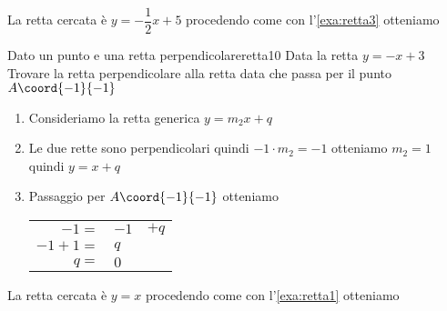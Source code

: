 La retta cercata è $y=-\dfrac{1}{2}x+5$ procedendo come con l'\cref{exa:retta3}
otteniamo
\begin{center}
	
	\label{fig:disegnoretta9}
\end{center}
\begin{esempiot}{Dato un punto e una retta perpendicolare}{retta10}
	Data la retta $y=-x+3$ Trovare la retta perpendicolare alla retta data che  passa per il punto	$A\coord{-1}{-1}$
\end{esempiot}
\begin{enumerate}
	\item Consideriamo la retta generica $y=m_2x+q$
	\item Le due rette sono perpendicolari quindi $-1\cdot m_2=-1$ otteniamo $m_2=1$ quindi $y=x+q$
	\item Passaggio per $A\coord{-1}{-1}$ otteniamo 
	\begin{tabular}{rll}
		$-1=$&$-1$&$+q$\\
		$-1+1=$&$q$\\
		$q=$&$0$\\
	\end{tabular}
\end{enumerate}

La retta cercata è $y=x$ procedendo come con l'\cref{exa:retta1}
otteniamo
\begin{center}
	
	\label{fig:disegnoretta10}
\end{center}
